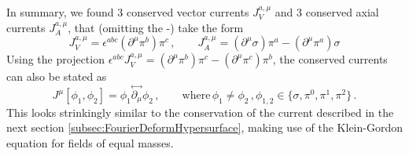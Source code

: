 In summary, we found 3 conserved vector currents $J_V^{a,\mu}$ and 3 conserved axial currents $J_A^{a,\mu}$, that (omitting the -) take the form
\begin{equation}
    J_V^{a,\mu}=\epsilon^{abc}(\partial^\mu\pi^b)\pi^c\,,\qquad J_A^{a,\mu}=(\partial^\mu\sigma)\pi^a-(\partial^\mu\pi^a)\sigma
\end{equation}
Using the projection $\epsilon^{abc}J_V^{a,\mu}=(\partial^\mu\pi^b)\pi^c-(\partial^\mu\pi^c)\pi^b$, the conserved currents can also be stated as
\begin{equation}
    J^\mu[\phi_1,\phi_2]=\phi_1\overset{\leftrightarrow}{\partial_\mu}\phi_2\,,\qquad\text{where}\,\phi_{1}\neq\phi_2\,,\phi_{1,2}\in\{\sigma,\pi^0,\pi^1,\pi^2\}\,.
\end{equation}
This looks strinkingly similar to the conservation of the current described in the next section \eqref{subsec:FourierDeformHypersurface}, making use of the Klein-Gordon equation for fields of equal masses.